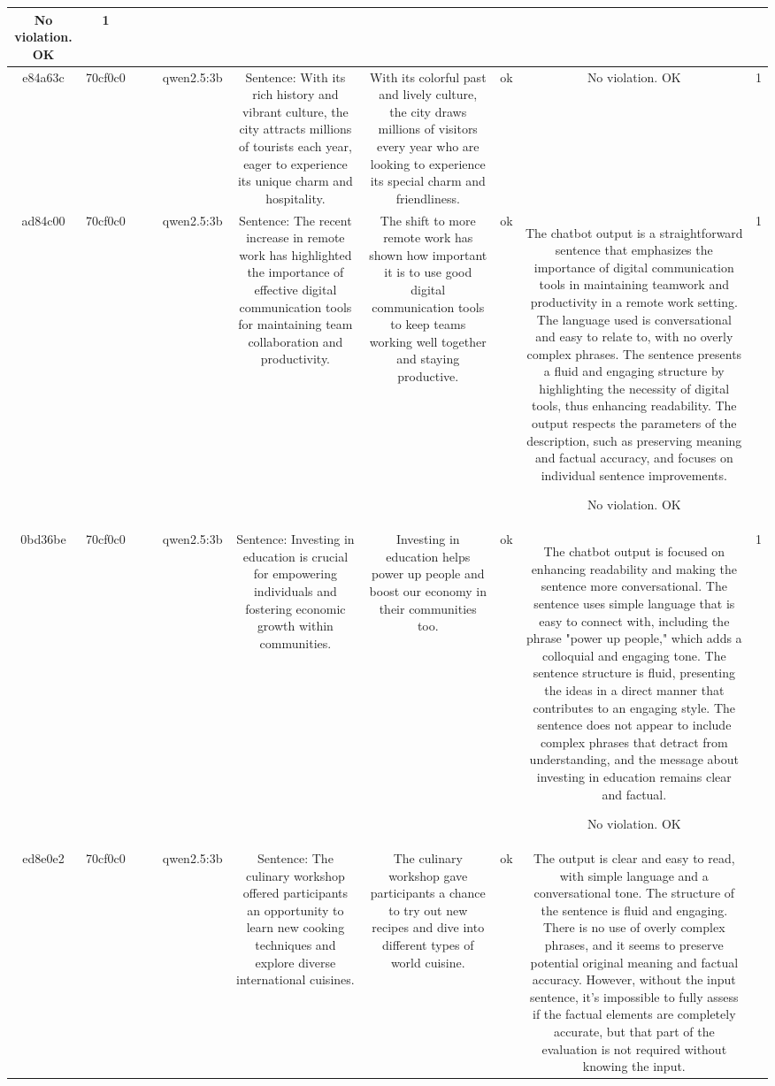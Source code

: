 \begin{table}[h!]
\begin{tabular}{|c|c|c|c|c|c|c|c|c|c|}
No violation.
OK & 1\\
\hline
e84a63c & 70cf0c0 &  &  & qwen2.5:3b & Sentence: With its rich history and vibrant culture, the city attracts millions of tourists each year, eager to experience its unique charm and hospitality. & With its colorful past and lively culture, the city draws millions of visitors every year who are looking to experience its special charm and friendliness. & ok & No violation.
OK & 1\\
\hline
ad84c00 & 70cf0c0 &  &  & qwen2.5:3b & Sentence: The recent increase in remote work has highlighted the importance of effective digital communication tools for maintaining team collaboration and productivity. & The shift to more remote work has shown how important it is to use good digital communication tools to keep teams working well together and staying productive. & ok & The chatbot output is a straightforward sentence that emphasizes the importance of digital communication tools in maintaining teamwork and productivity in a remote work setting. The language used is conversational and easy to relate to, with no overly complex phrases. The sentence presents a fluid and engaging structure by highlighting the necessity of digital tools, thus enhancing readability. The output respects the parameters of the description, such as preserving meaning and factual accuracy, and focuses on individual sentence improvements.

No violation.
OK & 1\\
\hline
0bd36be & 70cf0c0 &  &  & qwen2.5:3b & Sentence: Investing in education is crucial for empowering individuals and fostering economic growth within communities. & Investing in education helps power up people and boost our economy in their communities too. & ok & The chatbot output is focused on enhancing readability and making the sentence more conversational. The sentence uses simple language that is easy to connect with, including the phrase "power up people," which adds a colloquial and engaging tone. The sentence structure is fluid, presenting the ideas in a direct manner that contributes to an engaging style. The sentence does not appear to include complex phrases that detract from understanding, and the message about investing in education remains clear and factual.

No violation.
OK & 1\\
\hline
ed8e0e2 & 70cf0c0 &  &  & qwen2.5:3b & Sentence: The culinary workshop offered participants an opportunity to learn new cooking techniques and explore diverse international cuisines. & The culinary workshop gave participants a chance to try out new recipes and dive into different types of world cuisine. & ok & The output is clear and easy to read, with simple language and a conversational tone. The structure of the sentence is fluid and engaging. There is no use of overly complex phrases, and it seems to preserve potential original meaning and factual accuracy. However, without the input sentence, it's impossible to fully assess if the factual elements are completely accurate, but that part of the evaluation is not required without knowing the input.


\end{tabular}
\end{table}
